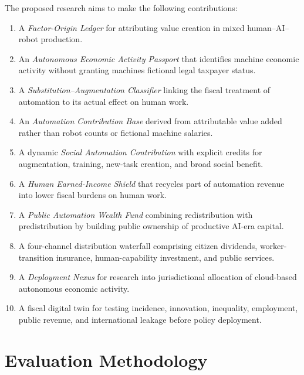 \documentclass[conference]{IEEEtran}
\begin{document}
The proposed research aims to make the following contributions:

\begin{enumerate}

\item A \textit{Factor-Origin Ledger} for attributing value creation in mixed
human--AI--robot production.

\item An \textit{Autonomous Economic Activity Passport} that identifies machine
economic activity without granting machines fictional legal taxpayer status.

\item A \textit{Substitution--Augmentation Classifier} linking the fiscal
treatment of automation to its actual effect on human work.

\item An \textit{Automation Contribution Base} derived from attributable value
added rather than robot counts or fictional machine salaries.

\item A dynamic \textit{Social Automation Contribution} with explicit credits
for augmentation, training, new-task creation, and broad social benefit.

\item A \textit{Human Earned-Income Shield} that recycles part of automation
revenue into lower fiscal burdens on human work.

\item A \textit{Public Automation Wealth Fund} combining redistribution with
predistribution by building public ownership of productive AI-era capital.

\item A four-channel distribution waterfall comprising citizen dividends,
worker-transition insurance, human-capability investment, and public services.

\item A \textit{Deployment Nexus} for research into jurisdictional allocation of
cloud-based autonomous economic activity.

\item A fiscal digital twin for testing incidence, innovation, inequality,
employment, public revenue, and international leakage before policy deployment.

\end{enumerate}

\section{Evaluation Methodology}
\end{document}
